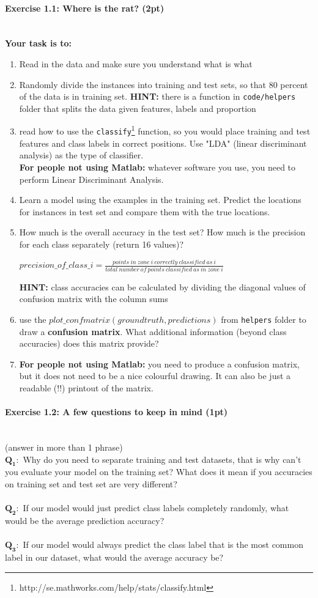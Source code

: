 \documentclass[a4paper,11pt]{article}
\newenvironment{exercise}[3]{\paragraph{Exercise #1: #2 (#3pt)}\ \\}{
\medskip}
\newcommand{\question}[2]{\setlength\parindent{0mm}\ \\$\mathbf{Q_#1:}$ #2\ \\}
\begin{document}
\begin{exercise}{1.1}{Where is the rat?}{2}
\textbf{Your task is to:}
\begin{enumerate}
\item Read in the data and make sure you understand what is what
\item Randomly divide the instances into training and test sets, so that 80 percent of the data is in training set. \textbf{HINT:} there is a function in \texttt{code/helpers} folder that splits the data given features, labels and proportion
\item read how to use the \texttt{classify}\footnote{http://se.mathworks.com/help/stats/classify.html} function, so you would place training and test features and class labels in correct positions. Use "LDA" (linear discriminant analysis) as the type of classifier.\\
\textbf{For people not using Matlab:} whatever software you use, you need to perform Linear Discriminant Analysis.
\item Learn a model using the examples in the training set. Predict the locations for instances in test set and compare them with the true locations.
\item How much is the overall accuracy in the test set? How much is the precision for each class separately (return 16 values)?\\
\begin{center}
$precision\_of\_class\_i=\frac{points\ in\ zone\ i\ correctly\ classified\ as\ i}{total\ number\ of\ points\ classified\ as\ in\ zone\ i}$
\end{center}
\textbf{HINT:} class accuracies can be calculated by dividing the diagonal values of confusion matrix with the column sums 
\item use the \emph{$plot\_confmatrix(groundtruth, predictions)$} from \texttt{helpers} folder to draw a \textbf{confusion matrix}. What additional information (beyond class accuracies) does this matrix provide?
\item \textbf{For people not using Matlab:} you need to produce a confusion matrix, but it does not need to be a nice colourful drawing. It can also be just a readable (!!) printout of the matrix.
\end{enumerate} 
\end{exercise}

%
%
\begin{exercise}{1.2}{A few questions to keep in mind}{1}
(answer in more than 1 phrase)
\question{1}{Why do you need to separate training and test datasets, that is why can't you evaluate your model on the training set? What does it mean if you accuracies on training set and test set are very different?}
\question{2}{If our model would just predict class labels completely randomly, what would be the average prediction accuracy?}
\question{3}{If our model would always predict the class label that is the most common label in our dataset, what would the average accuracy be?}
\end{exercise}
\end{document}
